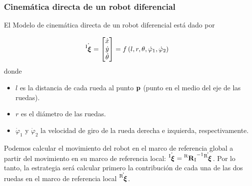 \begin{frame}
    \frametitle{Cinemática directa de un robot diferencial}
    \scriptsize
    \begin{figure}[!h]
    \end{figure}
    
   El Modelo de cinemática directa de un robot diferencial está dado por

    \begin{equation*}
        \dot{\prescript{\mathrm{I}}{}{{\boldsymbol{\mathbf{\xi}}}_\mathrm{}}} =
        \begin{bmatrix}
            \dot{x}\\
            \dot{y}\\
            \dot{\theta}
        \end{bmatrix} =
        f\left( l,r,\theta,\dot{\varphi}_{1},\dot{\varphi}_{2}\right)
    \end{equation*}
    donde
    \begin{itemize}
        \item $l$ es la distancia de cada rueda al punto $\boldsymbol{\mathbf{p}}$ (punto en el medio del eje de las ruedas).
        \item $r$ es el diámetro de las ruedas.
        \item $\dot{\varphi}_{1}$ y $\dot{\varphi}_{2}$ la velocidad de giro de la rueda derecha e izquierda, respectivamente.
    \end{itemize}

    Podemos calcular el movimiento del robot en el marco de referencia global a partir del movimiento en su marco de referencia local:  $\dot{\prescript{\mathrm{I}}{}{{\boldsymbol{\mathbf{\xi}}}_\mathrm{}}} = {\prescript{\mathrm{R}}{}{{\boldsymbol{\mathbf{R}}}_\mathrm{I}}}^{-1}\dot{\prescript{\mathrm{R}}{}{{\boldsymbol{\mathbf{\xi}}}_\mathrm{}}}$. Por lo tanto, la estrategia será calcular primero la contribución de cada una de las dos ruedas en el marco de referencia local $\dot{\prescript{\mathrm{R}}{}{{\boldsymbol{\mathbf{\xi}}}_\mathrm{}}}$.
\end{frame}


